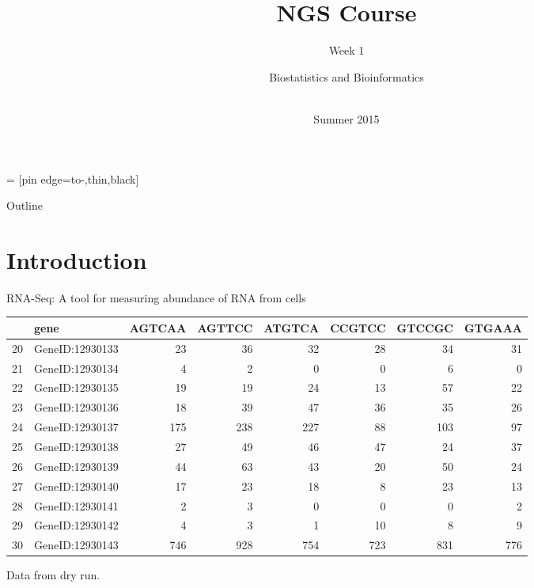 \documentclass[xcolor=x11names,compress]{beamer}\usepackage[]{graphicx}\usepackage[]{color}
\newenvironment{knitrout}{}{} %
\begin{document}
 = [pin edge={to-,thin,black}]

\begin{frame}
\title{NGS Course}
\subtitle{Week 1}
\author{Biostatistics and Bioinformatics}
\date{
\\
\vspace{0.5cm}
Summer 2015}
\titlepage

\end{frame}

\begin{frame}{Outline}
\tableofcontents
\end{frame}








\section{Introduction}

\begin{frame}[fragile]{RNA-Seq: A tool for measuring abundance of RNA from cells}
\begin{knitrout}\tiny
{}\color{fgcolor}
\begin{tabular}{l|l|r|r|r|r|r|r}
\hline
  & gene & AGTCAA & AGTTCC & ATGTCA & CCGTCC & GTCCGC & GTGAAA\\
\hline
20 & GeneID:12930133 & 23 & 36 & 32 & 28 & 34 & 31\\
\hline
21 & GeneID:12930134 & 4 & 2 & 0 & 0 & 6 & 0\\
\hline
22 & GeneID:12930135 & 19 & 19 & 24 & 13 & 57 & 22\\
\hline
23 & GeneID:12930136 & 18 & 39 & 47 & 36 & 35 & 26\\
\hline
24 & GeneID:12930137 & 175 & 238 & 227 & 88 & 103 & 97\\
\hline
25 & GeneID:12930138 & 27 & 49 & 46 & 47 & 24 & 37\\
\hline
26 & GeneID:12930139 & 44 & 63 & 43 & 20 & 50 & 24\\
\hline
27 & GeneID:12930140 & 17 & 23 & 18 & 8 & 23 & 13\\
\hline
28 & GeneID:12930141 & 2 & 3 & 0 & 0 & 0 & 2\\
\hline
29 & GeneID:12930142 & 4 & 3 & 1 & 10 & 8 & 9\\
\hline
30 & GeneID:12930143 & 746 & 928 & 754 & 723 & 831 & 776\\
\hline
\end{tabular}


\end{knitrout}
Data from dry run.
\end{frame}
\end{document}
